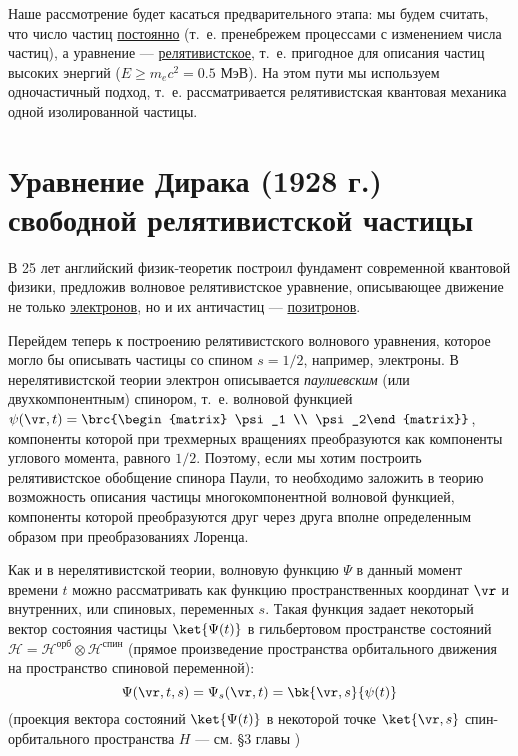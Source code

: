 Наше рассмотрение будет касаться предварительного этапа: мы будем считать, что число частиц \underline{постоянно} (т.~е. пренебрежем процессами с изменением числа частиц), а уравнение --- \underline{релятивистское}, т.~е. пригодное для описания частиц высоких энергий (${E \ge m_e c^2 = 0.5}$ МэВ). На этом пути мы используем одночастичный подход, т.~е. рассматривается релятивистская квантовая механика одной изолированной частицы.

\section{Уравнение Дирака (1928 г.) свободной релятивистской частицы}

В 25 лет английский физик-теоретик построил фундамент современной квантовой физики, предложив волновое релятивистское уравнение, описывающее движение не только \underline{электронов}, но и их античастиц --- \underline{позитронов}.

Перейдем теперь к построению релятивистского волнового уравнения, которое могло бы описывать частицы со спином $s = 1/2$, например, электроны. В нерелятивистской теории электрон описывается {\em паулиевским} (или двухкомпонентным) спинором, т.~е. волновой функцией $\psi(\vr, t) = \brc{\begin{matrix} \psi_1 \\ \psi_2\end{matrix}}$, компоненты которой при трехмерных вращениях преобразуются как компоненты углового момента, равного $1/2$. Поэтому, если мы хотим построить релятивистское обобщение спинора Паули, то необходимо заложить в теорию возможность описания частицы многокомпонентной волновой функцией, компоненты которой преобразуются друг через друга вполне определенным образом при преобразованиях Лоренца.

Как и в нерелятивистской теории, волновую функцию $\Psi$ в данный момент времени $t$ можно рассматривать как функцию пространственных координат $\vr$ и внутренних, или спиновых, переменных $s$. Такая функция задает некоторый вектор состояния частицы $\ket{\Psi(t)}$ в гильбертовом пространстве состояний $\mathcal{H} = \mathcal{H}^{\text{орб}} \otimes \mathcal{H}^{\text{спин}}$ (прямое произведение пространства орбитального движения на пространство спиновой переменной):
$$
\Psi(\vr, t, s) = \Psi_s(\vr, t) = \bk{\vr, s}{\psi(t)}
$$
(проекция вектора состояний $\ket{\Psi(t)}$ в некоторой точке $\ket{\vr, s}$ спин-орбитального пространства $H$ --- см. \S 3 главы )

